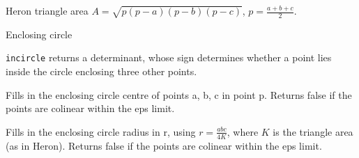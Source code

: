 \begin{algorithm}{Heron triangle area}
\desc
$A=\sqrt{p(p-a)(p-b)(p-c)}$, $p=\frac{a+b+c}{2}$.
\end{algorithm}



\begin{algorithm}{Enclosing circle}

\desc
{\tt incircle} returns a determinant, whose sign determines whether a point
lies inside the circle enclosing three other points.


\desc
Fills in the enclosing circle centre of points a, b, c in point p.
Returns false if the points are colinear within the eps limit.

\desc
Fills in the enclosing circle radius in r, using $r=\frac{abc}{4K}$,
where $K$ is the triangle area (as in Heron).
Returns false if the points are colinear within the eps limit.
\end{algorithm}


